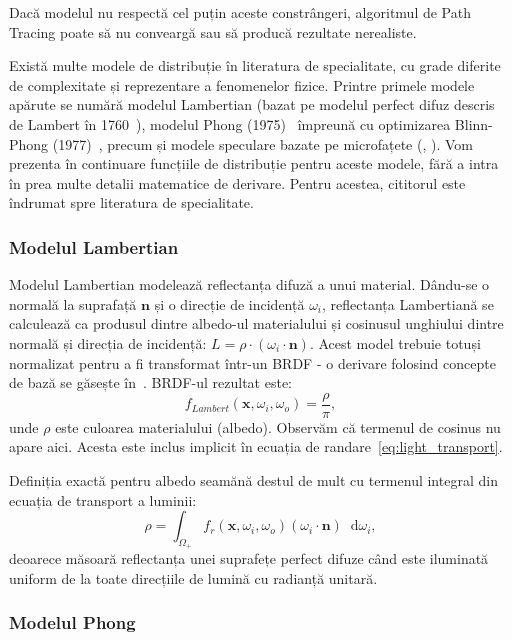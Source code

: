 \documentclass[12pt,a4paper]{report}
\newcommand*\diff{\mathop{}\!\mathrm{d}}
\numberwithin{equation}{section} %
\begin{document}
Dacă modelul nu respectă cel puțin aceste constrângeri, algoritmul de Path Tracing
poate să nu conveargă sau să producă rezultate nerealiste.

Există multe modele de distribuție în literatura de specialitate, cu grade diferite de complexitate și
reprezentare a fenomenelor fizice. Printre primele modele apărute se numără
modelul Lambertian (bazat pe modelul perfect difuz descris de Lambert în 1760~\cite{Lambert}),
modelul Phong (1975)~\cite{Phong} împreună cu optimizarea Blinn-Phong (1977)~\cite{BlinnPhong},
precum și modele speculare bazate pe microfațete (\cite{TorranceOld}, \cite{CookTorrance}).
Vom prezenta în continuare funcțiile de distribuție pentru aceste modele, fără a intra
în prea multe detalii matematice de derivare. Pentru acestea, cititorul este îndrumat
spre literatura de specialitate.

\subsubsection*{Modelul Lambertian}

Modelul Lambertian modelează reflectanța difuză a unui material. Dându-se o normală
la suprafață $\mathbf{n}$ și o direcție de incidență $\omega_i$, reflectanța Lambertiană
se calculează ca produsul dintre albedo-ul materialului și cosinusul unghiului dintre normală și direcția de incidență:
$L = \rho \cdot (\omega_i \cdot \mathbf{n})$. Acest model trebuie totuși normalizat pentru
a fi transformat într-un BRDF - o derivare folosind concepte de bază se găsește în~\cite{LambertBRDF}.
BRDF-ul rezultat este:
\begin{equation}\label{eq:lambert}
	f_{Lambert}(\mathbf{x}, \omega_i, \omega_o) = \frac{\rho}{\pi},
\end{equation}
unde $\rho$ este culoarea materialului (albedo). Observăm că termenul de cosinus
nu apare aici. Acesta este inclus implicit în ecuația de randare~\ref{eq:light_transport}.

Definiția exactă pentru albedo
seamănă destul de mult cu termenul integral din ecuația de transport a luminii:
\begin{equation}
	\rho = \int_{\Omega_+} f_r(\mathbf{x}, \omega_i, \omega_o) (\omega_i \cdot \mathbf{n}) \diff \omega_i,
\end{equation}
deoarece măsoară reflectanța unei suprafețe perfect difuze când este iluminată
uniform de la toate direcțiile de lumină cu radianță unitară.

\subsubsection*{Modelul Phong}
\end{document}
